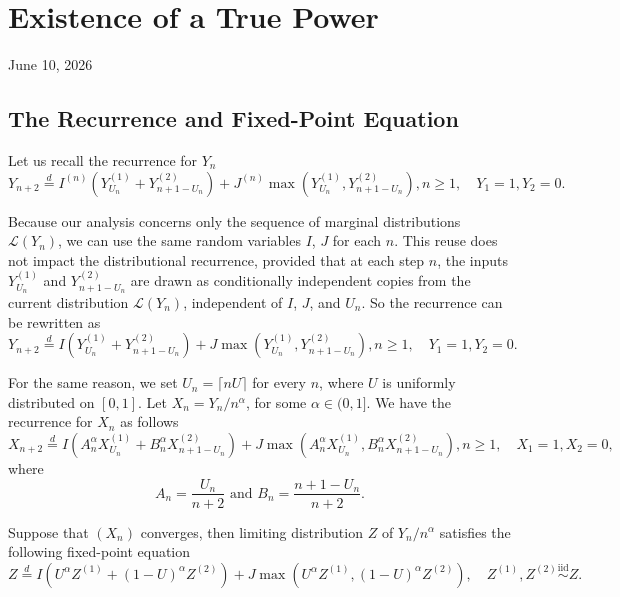 \chapter{Existence of a True Power}
\begin{center}
  June 10, 2026
  \vspace{0.5cm}
\end{center}

\section{The Recurrence and Fixed-Point Equation}

Let us recall the recurrence for $Y_n$
$$Y_{n+2} \stackrel{d}{=} I^{(n)}\left(Y_{U_n}^{(1)} + Y_{n+1-U_n}^{(2)}\right) + J^{(n)}\max\left(Y_{U_n}^{(1)}, Y_{n+1-U_n}^{(2)}\right), n\ge 1, \quad Y_1=1, Y_2=0.$$

Because our analysis concerns only the sequence of marginal distributions $\mathcal{L}(Y_n)$, we can use the same random variables $I$, $J$ for each $n$. This reuse does not impact the distributional recurrence, provided that at each step $n$, the inputs $Y_{U_n}^{(1)}$ and $Y_{n+1-U_n}^{(2)}$ are drawn as conditionally independent copies from the current distribution $\mathcal{L}(Y_n)$, independent of $I$, $J$, and $U_n$. So the recurrence can be rewritten as
\begin{equation}
  Y_{n+2} \stackrel{d}{=} I\left(Y_{U_n}^{(1)} + Y_{n+1-U_n}^{(2)}\right) + J\max\left(Y_{U_n}^{(1)}, Y_{n+1-U_n}^{(2)}\right), n\ge 1, \quad Y_1=1, Y_2=0.
\end{equation}

For the same reason, we set $U_n = \lceil nU \rceil$ for every $n$, where $U$ is uniformly distributed on $[0,1]$. Let $X_n = Y_n/n^{\alpha}$, for some $\alpha \in (0,1]$. We have the recurrence for $X_n$ as follows
\begin{equation}
  \label{eq:normalized-recurrence}
  X_{n+2}
  \stackrel{d}{=} I\left(A_n^{\alpha} X_{U_n}^{(1)} + B_n^{\alpha} X_{n+1-U_n}^{(2)}\right) +  J\max\left(A_n^{\alpha} X_{U_n}^{(1)}, B_n^{\alpha} X_{n+1-U_n}^{(2)}\right), n\ge 1, \quad X_1=1, X_2=0,
\end{equation}
where
$$A_n = \dfrac{U_n}{n+2} \text{ and } B_n =\dfrac{n+1-U_n}{n+2}.$$

Suppose that $(X_n)$ converges, then limiting distribution $Z$ of $Y_n/n^{\alpha}$ satisfies the following fixed-point equation
\begin{equation}
  \label{eq:fixed-point}
  Z \stackrel{d}{=} I\left(U^{\alpha} Z^{(1)} + \left(1-U\right)^{\alpha} Z^{(2)}\right) + J\max\left(U^{\alpha} Z^{(1)}, \left(1-U\right)^{\alpha} Z^{(2)}\right), \quad Z^{(1)}, Z^{(2)} \stackrel{\text{iid}}{\sim} Z.
\end{equation}

